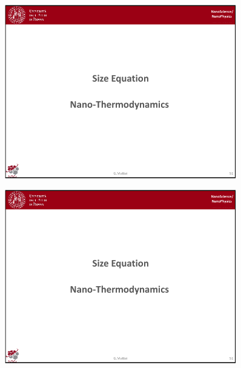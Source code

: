 \documentclass[../main/main.tex]{subfiles}
\begin{document}
\newpage

\begin{figure}[h!]
\centering
\includegraphics[page=9,width=0.9\textwidth]{../lessons/pdf_file/3_lesson.pdf}
\end{figure}

\begin{figure}[h!]
\centering
\includegraphics[page=10,width=0.9\textwidth]{../lessons/pdf_file/3_lesson.pdf}
\end{figure}



\newpage
\end{document}
